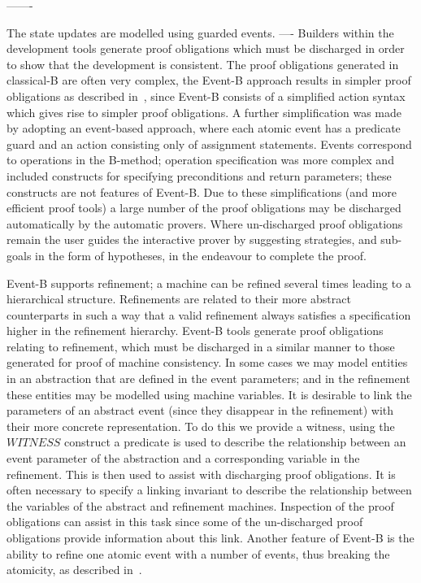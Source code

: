 -------

The state updates are modelled using guarded events. 
----
Builders within the development tools generate proof obligations which must be discharged in order to show that the development is consistent. The proof obligations generated in classical-B are often very complex, the Event-B approach results in simpler proof obligations as described in~\cite{Hallerstede07}, since Event-B consists of a simplified action syntax which gives rise to simpler proof obligations. A further simplification was made by adopting an event-based approach, where each atomic event has a predicate guard and an action consisting only of assignment statements. Events correspond to operations in the B-method; operation specification was more complex and included constructs for specifying preconditions and return parameters; these constructs are not features of Event-B. Due to these simplifications (and more efficient proof tools) a large number of the proof obligations may be discharged automatically by the automatic provers. Where un-discharged proof obligations remain the user guides the interactive prover by suggesting strategies, and sub-goals in the form of hypotheses, in the endeavour to complete the proof. 

Event-B supports refinement; a machine can be refined several times leading to a hierarchical structure. Refinements are related to their more abstract counterparts in such a way that a valid refinement always satisfies a specification higher in the refinement hierarchy. Event-B tools generate proof obligations relating to refinement, which must be discharged in a similar manner to those generated for proof of machine consistency. In some cases we may model entities in an abstraction that are defined in the event parameters; and in the refinement these entities may be modelled using machine variables. It is desirable to link the parameters of an abstract event (since they disappear in the refinement) with their more concrete representation. To do this we provide a witness, using the $WITNESS$ construct a predicate is used to describe the relationship between an event parameter of the abstraction and a corresponding variable in the refinement. This is then used to assist with discharging proof obligations. It is often necessary to specify a linking invariant to describe the relationship between the variables of the abstract and refinement machines. Inspection of the proof obligations can assist in this task since some of the un-discharged proof obligations provide information about this link. Another feature of Event-B is the ability to  refine one atomic event with a number of events, thus breaking the atomicity, as described in~\cite{Butler08}. 

